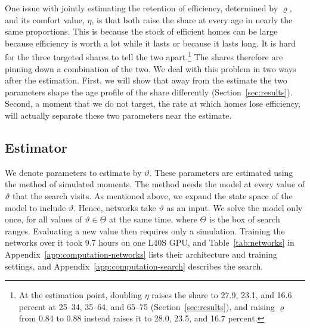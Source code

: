 One issue with jointly estimating the retention of efficiency, determined by $\varrho$,  and its comfort value, $\eta$, is that both raise the share at every
age in nearly the same proportions. This is because the stock of efficient homes can be
large because efficiency is worth a lot while it lasts or because it lasts
long. It is hard for the three targeted shares to tell the two apart.\footnote{ At the estimation point, doubling $\eta$ raises the share to 27.9, 23.1, and 16.6 percent at 25--34,
35--64, and 65--75 (Section~\ref{sec:results}), and raising $\varrho$ from 0.84 to 0.88 instead raises
it to 28.0, 23.5, and 16.7 percent.} The shares therefore are  pinning down a combination of
the two. We deal with this problem in two ways after the estimation. First, we will show that away from the estimate the two parameters shape the age
profile of the share differently (Section~\ref{sec:results}). Second, a moment that we do not target,
the rate at which homes lose efficiency, will actually separate these two parameters near the estimate.



\subsection{Estimator}\label{sec:smm}

We denote parameters to estimate by $\vartheta$. These parameters are estimated using the method of simulated moments. The method needs the model at every value of $\vartheta$ that the search
visits. As mentioned above, we expand the state space of the model to include $\vartheta$. Hence,  networks take $\vartheta$ as an input. We solve the model only once,
for all values of $\vartheta \in \Theta$ at the same time, where $\Theta$ is the box of
search ranges. Evaluating
a new value then requires only a simulation.  Training the networks
over it took 9.7 hours on one L40S GPU, and Table~\ref{tab:networks} in Appendix~\ref{app:computation-networks} lists their architecture and training
settings, and Appendix~\ref{app:computation-search} describes the search.


